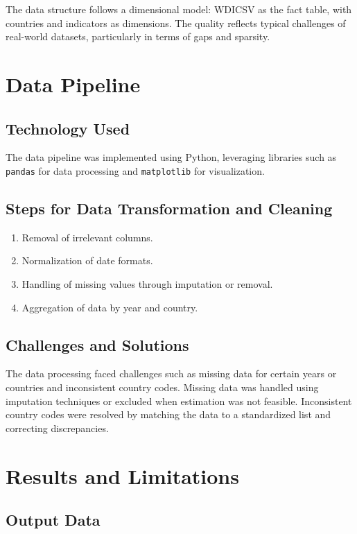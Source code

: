 \documentclass[a4paper,12pt]{article}
\begin{document}
The data structure follows a dimensional model: WDICSV as the fact table, with countries and indicators as dimensions. The quality reflects typical challenges of real-world datasets, particularly in terms of gaps and sparsity.

\section{Data Pipeline}

\subsection{Technology Used}

The data pipeline was implemented using Python, leveraging libraries such as \texttt{pandas} for data processing and \texttt{matplotlib} for visualization.

\subsection{Steps for Data Transformation and Cleaning}

\begin{enumerate}
    \item Removal of irrelevant columns.
    \item Normalization of date formats.
    \item Handling of missing values through imputation or removal.
    \item Aggregation of data by year and country.
\end{enumerate}

\subsection{Challenges and Solutions}

The data processing faced challenges such as missing data for certain years or countries and inconsistent country codes. Missing data was handled using imputation techniques or excluded when estimation was not feasible. Inconsistent country codes were resolved by matching the data to a standardized list and correcting discrepancies.

\section{Results and Limitations}

\subsection{Output Data}
\end{document}
